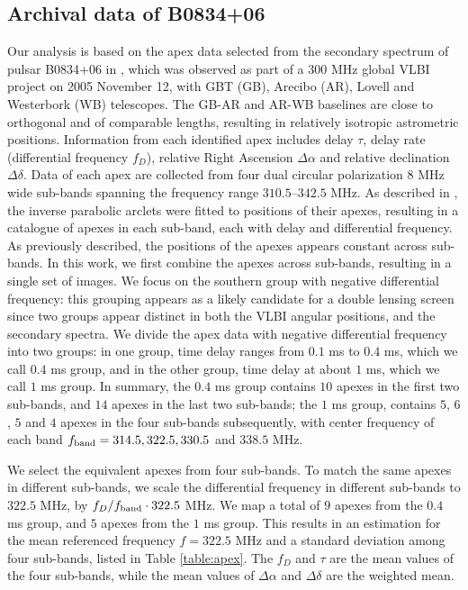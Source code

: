 \documentclass[useAMS,usenatbib]{mn2e}
\begin{document}
\subsection{Archival data of B0834+06}
\label{21}
Our analysis is based on the apex data selected from the secondary
spectrum of pulsar B0834+06 in \citep{2010ApJ...708..232B}, which was
observed as part of a 300 MHz global VLBI project on 2005 November 12, with
GBT (GB), Arecibo (AR), Lovell and Westerbork (WB) telescopes.  The GB-AR and AR-WB
baselines are close to orthogonal and of comparable lengths, resulting
in relatively isotropic astrometric positions.
Information from each identified apex includes delay $\tau$,
delay rate (differential frequency $f_D$), relative Right Ascension
$\Delta\alpha$ and relative declination $\Delta\delta$.
Data of each apex are collected from four dual circular polarization $8$ MHz wide sub-bands spanning the frequency range $310.5$--$342.5$ MHz. 
As described in \citep{2010ApJ...708..232B}, the inverse parabolic
arclets were fitted to positions of their apexes, resulting in a
catalogue of apexes in each sub-band, each with delay and differential
frequency.  As previously described, the positions of the apexes
appears constant across sub-bands.  In this work, we first combine the
apexes across sub-bands, resulting in a single set of images.  We focus on
the southern group with negative differential frequency: this
grouping appears as a likely candidate for a double lensing screen
since two groups appear distinct in both the VLBI angular positions, and the
secondary spectra.
We divide the apex data with negative differential frequency into two
groups: in one group, time delay ranges from $0.1$ ms to $0.4$ ms,
which we call $0.4$ ms group, and in the other group, time delay at
about $1$ ms, which we call $1$ ms group.  In summary, the
$0.4$ ms group contains $10$ apexes in the first two sub-bands, and $14$ apexes in the last two sub-bands; the $1$ ms group, contains $5$, $6$, $5$ and $4$ apexes in the four sub-bands subsequently, with center frequency of each band $f_{\rm band}=314.5, 322.5, 330.5$ and $ 338.5$ MHz. 

We select the equivalent apexes from four sub-bands. To match the same apexes in different sub-bands, we scale the differential frequency in different sub-bands to $322.5$ MHz, by $f_D/f_{\rm band}\cdot322.5$ MHz. We map
a total of $9$ apexes from the $0.4$ ms group, and $5$ apexes from the $1$ ms
group. This results in an estimation
for the mean referenced frequency $f=322.5$ MHz and a standard deviation among four sub-bands, listed in Table
\ref{table:apex}. The $f_D$ and $\tau$ are the mean values of the four sub-bands,
while the mean values of $\Delta\alpha$ and $\Delta\delta$ are the weighted mean.
\end{document}
